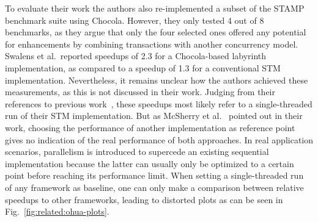 To evaluate their work the authors also re-implemented a subset of the STAMP benchmark suite using Chocola.
However, they only tested 4 out of 8 benchmarks, as they argue that only the four selected ones offered any potential for enhancements by combining transactions with another concurrency model.
Swalens et al.\ reported speedups of 2.3 for a Chocola-based labyrinth implementation, as compared to a speedup of 1.3 for a conventional STM implementation.
Nevertheless, it remains unclear how the authors achieved these measurements, as this is not discussed in their work.
Judging from their references to previous work~\cite{swalens2016transactional, swalens2017transactional}, these speedups most likely refer to a single-threaded run of their STM implementation.
But as McSherry et al.~\cite{mcsherry2015scalability} pointed out in their work, choosing the performance of another implementation as reference point gives no indication of the real performance of both approaches.
In real application scenarios, parallelism is introduced to supercede an existing sequential implementation because the latter can usually only be optimized to a certain point before reaching its performance limit.
When setting a single-threaded run of any framework as baseline, one can only make a comparison between relative speedups to other frameworks, leading to distorted plots as can be seen in Fig.~\ref{fig:related:ohua-plots}.

